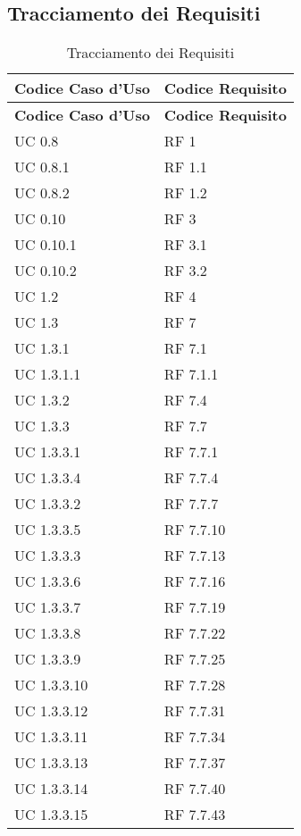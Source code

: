 \subsection{Tracciamento dei Requisiti}{ 
\renewcommand*{\arraystretch}{1.4} 
\begin{longtable} [c]{| p{4cm} | p{4cm} |} 
\caption{Tracciamento dei Requisiti \label{tab:traccReq}}\\ \hline\textbf{Codice Caso d'Uso} & \textbf{Codice Requisito} \\ 
\hline \endfirsthead \hline 
\textbf{Codice Caso d'Uso} & \textbf{Codice Requisito} \\ 
\hline \endhead \hline \endfoot \hline \endlastfoot 
UC 0.8 & RF 1\\ 
 \hline 
UC 0.8.1 & RF 1.1\\ 
 \hline 
UC 0.8.2 & RF 1.2\\ 
 \hline 
UC 0.10 & RF 3\\ 
 \hline 
UC 0.10.1 & RF 3.1\\ 
 \hline 
UC 0.10.2 & RF 3.2\\ 
 \hline 
UC 1.2 & RF 4\\ 
 \hline 
UC 1.3 & RF 7\\ 
 \hline 
UC 1.3.1 & RF 7.1\\ 
 \hline 
UC 1.3.1.1 & RF 7.1.1\\ 
 \hline 
UC 1.3.2 & RF 7.4\\ 
 \hline 
UC 1.3.3 & RF 7.7\\ 
 \hline 
UC 1.3.3.1 & RF 7.7.1\\ 
 \hline 
UC 1.3.3.4 & RF 7.7.4\\ 
 \hline 
UC 1.3.3.2 & RF 7.7.7\\ 
 \hline 
UC 1.3.3.5 & RF 7.7.10\\ 
 \hline 
UC 1.3.3.3 & RF 7.7.13\\ 
 \hline 
UC 1.3.3.6 & RF 7.7.16\\ 
 \hline 
UC 1.3.3.7 & RF 7.7.19\\ 
 \hline 
UC 1.3.3.8 & RF 7.7.22\\ 
 \hline 
UC 1.3.3.9 & RF 7.7.25\\ 
 \hline 
UC 1.3.3.10 & RF 7.7.28\\ 
 \hline 
UC 1.3.3.12 & RF 7.7.31\\ 
 \hline 
UC 1.3.3.11 & RF 7.7.34\\ 
 \hline 
UC 1.3.3.13 & RF 7.7.37\\ 
 \hline 
UC 1.3.3.14 & RF 7.7.40\\ 
 \hline 
UC 1.3.3.15 & RF 7.7.43\\ 

\end{longtable}}
